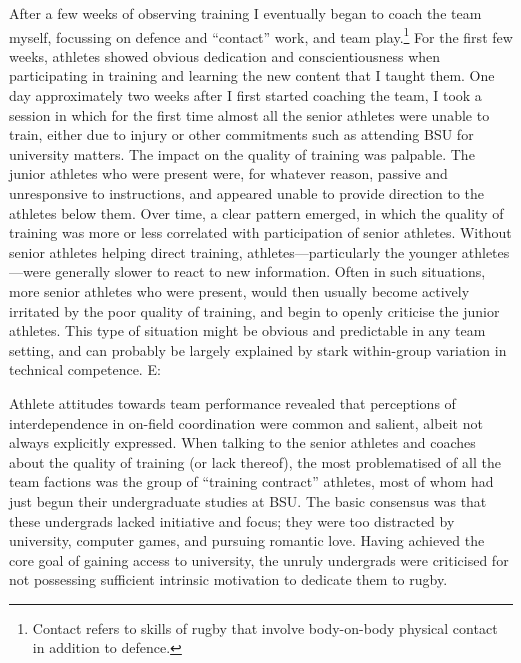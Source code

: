 \begin{CJK}{UTF8}{gbsn}
After a few weeks of observing training I eventually began to coach the team myself, focussing on defence and ``contact'' work, and team play.\footnote{Contact refers to skills of rugby that involve body-on-body physical contact in addition to defence.}  For the first few weeks, athletes showed obvious dedication and conscientiousness when participating in training and learning the new content that I taught them.  One day approximately two weeks after I first started coaching the team,  I took a session in which for the first time almost all the senior athletes were unable to train, either due to injury or other commitments such as attending BSU for university matters.  The impact on the quality of training was palpable.  The junior athletes who were present were, for whatever reason, passive and unresponsive to instructions, and appeared unable to provide direction to the athletes below them.  Over time, a clear pattern emerged, in which the quality of training was more or less correlated with participation of senior athletes. Without senior athletes helping direct training, athletes---particularly the younger athletes---were generally slower to react to new information.  Often in such situations, more senior athletes who were present, would then usually become actively irritated by the poor quality of training, and begin to openly criticise the junior athletes.  This type of situation might be obvious and predictable in any team setting, and can probably be largely explained by stark within-group variation in technical competence.
E:

 Athlete attitudes towards team performance revealed that perceptions of interdependence in on-field coordination were common and salient, albeit not always explicitly expressed. When talking to the senior athletes and coaches about the quality of training (or lack thereof), the most problematised of all the team factions was the group of ``training contract'' athletes, most of whom had just begun their undergraduate studies at BSU.  The basic consensus was that these undergrads lacked initiative and focus; they were too distracted by university, computer games, and pursuing romantic love. Having achieved the core goal of gaining access to university, the unruly undergrads were criticised for not possessing sufficient intrinsic motivation to dedicate them to rugby.


\end{CJK}
